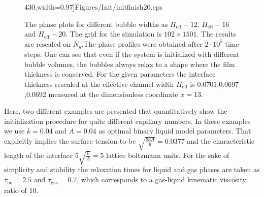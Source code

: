 \documentclass{article}
\begin{document}
\begin{figure}
430,width=0.97\textwidth]{Figures/Init/initfinish20.eps}\\
\caption{The phase plots for different bubble widths as
$H_{\mathrm{eff}}-12$, $H_{\mathrm{eff}}-16$ and
$H_{\mathrm{eff}}-20$. The grid for the simulation is $102 \times 1501$. The results are rescaled
on $N_y$.The phase
profiles were obtained after $2\cdot10^5$ time steps. One can see that even if the
system is initialized with different bubble volumes, the bubbles always relax
to a shape where the film thickness is conserved. For the given parameters the
interface thickness rescaled at the effective channel width $H_{\mathrm{eff}}$  is
$0.0701$,$0.0697$,$0.0692$ measured at the dimensionless coordinate $x=13$.
\label{fig:different:initialization:widths}}
\end{figure}

Here, two different examples are presented that quantitatively show the
initialization procedure for quite different capillary numbers. In these
examples we use $k=0.04$ and $A=0.04$ as optimal binary liquid model parameters.
That explicitly implies the surface tension to be $\sqrt{\frac{8 k
A}{9}}=0.0377$ and the characteristic length of the interface
$5\sqrt{\frac{k}{A}}=5$ lattice boltzmann units. For the sake of simplicity and
stability the relaxation times for liquid and gas phases are taken as
$\tau_{\mathrm{liq}}=2.5$ and $\tau_{\mathrm{gas}}=0.7$, which corresponds
to a gas-liquid kinematic viscosity ratio of $10$.
\end{document}
